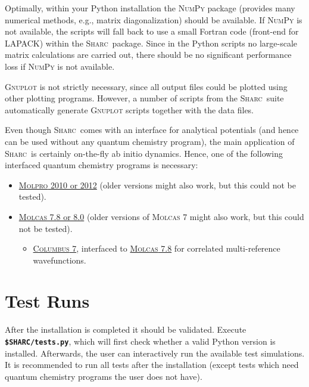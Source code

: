 \documentclass[a4paper,11pt,DIV=15,openany,twoside=false]{scrbook}
\newcommand{\sharc}{\textsc{Sharc}}
\newcommand{\ttt}[1]{\textbf{\texttt{#1}}}
\begin{document}
Optimally, within your Python installation the \textsc{NumPy} package (provides many numerical methods, e.g., matrix diagonalization) should be available. If \textsc{NumPy} is not available, the scripts will fall back to use a small Fortran code (front-end for LAPACK) within the \sharc\ package. Since in the Python scripts no large-scale matrix calculations are carried out, there should be no significant performance loss if \textsc{NumPy} is not available.

\textsc{Gnuplot} is not strictly necessary, since all output files could be plotted using other plotting programs. However, a number of scripts from the \sharc\ suite automatically generate \textsc{Gnuplot} scripts together with the data files.

Even though \sharc\ comes with an interface for analytical potentials (and hence can be used without any quantum chemistry program), the main application of \sharc\ is certainly on-the-fly ab initio dynamics. Hence, one of the following interfaced quantum chemistry programs is necessary:
\begin{itemize}
  \item \href{http://www.molpro.net/}{\textsc{Molpro} 2010 or 2012} (older versions might also work, but this could not be tested).
  \item \href{http://http://molcas.org/}{\textsc{Molcas} 7.8 or 8.0} (older versions of \textsc{Molcas} 7 might also work, but this could not be tested).
  \begin{itemize}
    \item \href{http://www.univie.ac.at/columbus/docs_COL70/documentation_main.html}{\textsc{Columbus} 7}, interfaced to \href{http://http://molcas.org/}{\textsc{Molcas} 7.8} for correlated multi-reference wavefunctions. 
  \end{itemize}
\end{itemize}


\section{Test Runs}

After the installation is completed it should be validated. Execute \ttt{\$SHARC/tests.py}, which will first check whether a valid Python version is installed. Afterwards, the user can interactively run the available test simulations. It is recommended to run all tests after the installation (except tests which need quantum chemistry programs the user does not have). 
\end{document}

